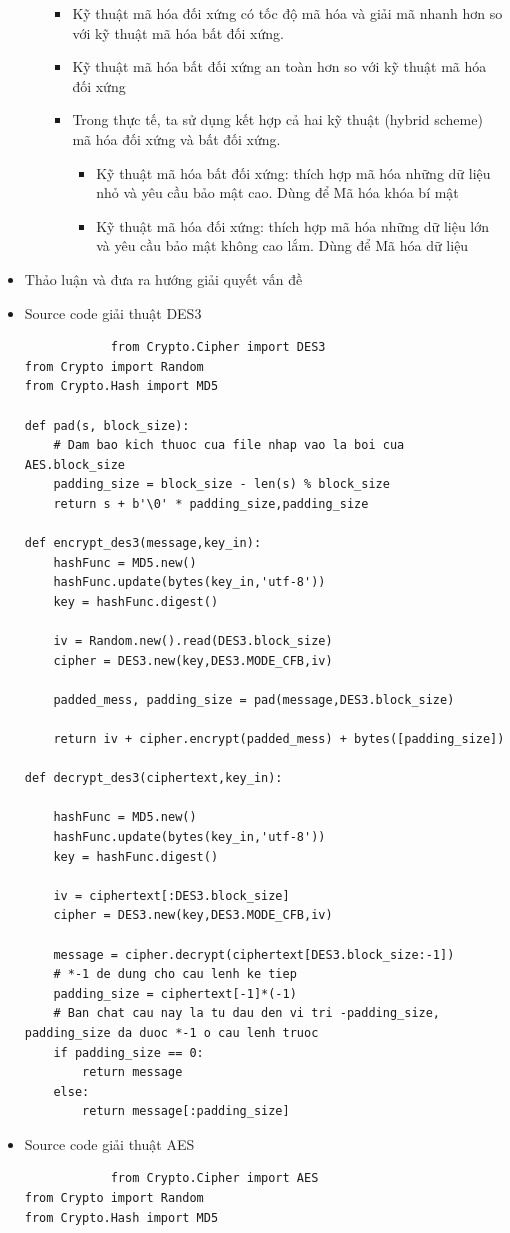 \documentclass[a4paper]{article}
\begin{document}
\begin{itemize}
\begin{itemize}
\begin{itemize}
			\item
			Kỹ thuật mã hóa đối xứng có tốc độ mã hóa và giải mã
nhanh hơn so với kỹ thuật mã hóa bất đối xứng.
			\item
			Kỹ thuật mã hóa bất đối xứng an toàn hơn so với kỹ thuật
mã hóa đối xứng
			\item
			Trong thực tế, ta sử dụng kết hợp cả hai kỹ thuật (hybrid
scheme) mã hóa đối xứng và bất đối xứng.
			\begin{itemize}
				\item
				Kỹ thuật mã hóa bất đối xứng: thích hợp mã hóa những dữ liệu
nhỏ và yêu cầu bảo mật cao. Dùng để Mã hóa khóa bí mật
				\item
				Kỹ thuật mã hóa đối xứng: thích hợp mã hóa những dữ liệu
lớn và yêu cầu bảo mật không cao lắm. Dùng để Mã hóa dữ liệu
			\end{itemize}
		\end{itemize}
	\end{itemize}
	\item
	Thảo luận và đưa ra hướng giải quyết vấn đề
	\item
	Source code giải thuật DES3
			\begin{lstlisting}
			from Crypto.Cipher import DES3
from Crypto import Random
from Crypto.Hash import MD5

def pad(s, block_size):
    # Dam bao kich thuoc cua file nhap vao la boi cua AES.block_size
    padding_size = block_size - len(s) % block_size
    return s + b'\0' * padding_size,padding_size

def encrypt_des3(message,key_in):
    hashFunc = MD5.new()
    hashFunc.update(bytes(key_in,'utf-8'))
    key = hashFunc.digest()

    iv = Random.new().read(DES3.block_size)
    cipher = DES3.new(key,DES3.MODE_CFB,iv)

    padded_mess, padding_size = pad(message,DES3.block_size)

    return iv + cipher.encrypt(padded_mess) + bytes([padding_size])

def decrypt_des3(ciphertext,key_in):

    hashFunc = MD5.new()
    hashFunc.update(bytes(key_in,'utf-8'))
    key = hashFunc.digest()

    iv = ciphertext[:DES3.block_size]
    cipher = DES3.new(key,DES3.MODE_CFB,iv)

    message = cipher.decrypt(ciphertext[DES3.block_size:-1])
    # *-1 de dung cho cau lenh ke tiep
    padding_size = ciphertext[-1]*(-1)
    # Ban chat cau nay la tu dau den vi tri -padding_size, padding_size da duoc *-1 o cau lenh truoc
    if padding_size == 0:
        return message
    else:
        return message[:padding_size]
			\end{lstlisting}
			\item
	Source code giải thuật AES
			\begin{lstlisting}
			from Crypto.Cipher import AES
from Crypto import Random
from Crypto.Hash import MD5


\end{lstlisting}
\end{itemize}
\end{document}
